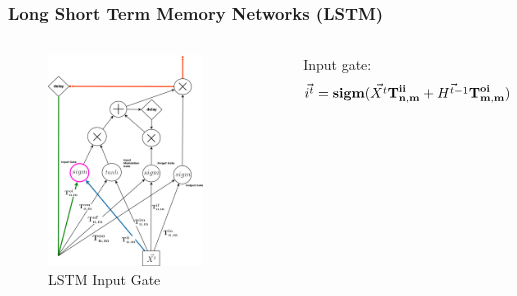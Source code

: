 \documentclass{beamer}
\begin{document}
\begin{frame}
\frametitle{Long Short Term Memory Networks (LSTM)}
\begin{columns}
\begin{figure}[t!]
    \centering
    \includegraphics[width=0.8\textwidth]{./pictures/figures/LSTM_input_gate.png}
    \caption{LSTM Input Gate}
    \label{fig:LSTM_input_gate}
\end{figure}

Input gate:
$$\vec{i^t} = \bold{sigm}(\vec{X^t}\bold{T_{n,m}^{ii}} + \vec{H^{t-1}}\bold{T_{m,m}^{oi}})$$
\end{columns}
\end{frame}
\end{document}
